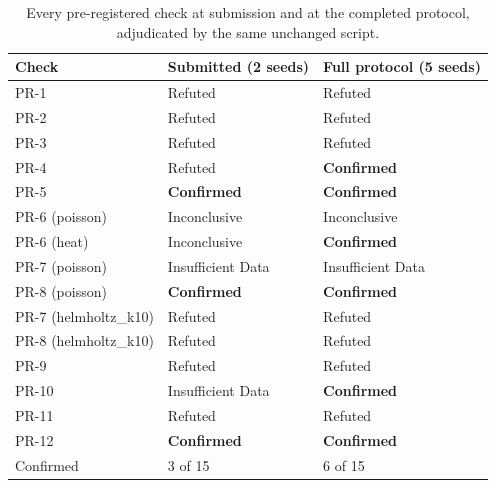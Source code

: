 \begin{table}[htbp]
  \centering
  \small
  \begin{tabular}{lll}
  \toprule
  Check & Submitted (2 seeds) & Full protocol (5 seeds) \\
  \midrule
  PR-1 & Refuted & Refuted \\
  PR-2 & Refuted & Refuted \\
  PR-3 & Refuted & Refuted \\
  PR-4 & Refuted & \textbf{Confirmed} \\
  PR-5 & \textbf{Confirmed} & \textbf{Confirmed} \\
  PR-6 (poisson) & Inconclusive & Inconclusive \\
  PR-6 (heat) & Inconclusive & \textbf{Confirmed} \\
  PR-7 (poisson) & Insufficient Data & Insufficient Data \\
  PR-8 (poisson) & \textbf{Confirmed} & \textbf{Confirmed} \\
  PR-7 (helmholtz\_k10) & Refuted & Refuted \\
  PR-8 (helmholtz\_k10) & Refuted & Refuted \\
  PR-9 & Refuted & Refuted \\
  PR-10 & Insufficient Data & \textbf{Confirmed} \\
  PR-11 & Refuted & Refuted \\
  PR-12 & \textbf{Confirmed} & \textbf{Confirmed} \\
  \midrule
  Confirmed & 3 of 15 & 6 of 15 \\
  \bottomrule
  \end{tabular}
  \caption{Every pre-registered check at submission and at the completed protocol,
    adjudicated by the same unchanged script.}
  \label{tab:fullprotocol}
\end{table}

